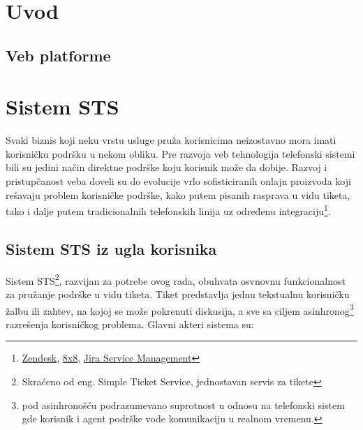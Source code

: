 \documentclass[12pt,oneside]{memoir}
\begin{document}
\frontmatter
\naslovna
\komisija
\apstrakt
\tableofcontents*

\mainmatter

\chapter{Uvod}
\section{Veb platforme}

\chapter{Sistem STS}
Svaki biznis koji neku vrstu usluge pruža korisnicima neizostavno mora imati korisničku podršku u nekom obliku. Pre razvoja veb tehnologija telefonski sistemi bili su jedini način direktne podrške koju korisnik može da dobije. Razvoj i pristupčanost veba doveli su do evolucije vrlo sofisticiranih onlajn proizvoda koji rešavaju problem korisničke podrške, kako putem pisanih rasprava u vidu tiketa, tako i dalje putem tradicionalnih telefonskih linija uz određenu integraciju\footnote{\href{http://zendesk.com}{Zendesk}, \href{https://www.8x8.com/}{8x8}, \href{https://www.atlassian.com/software/jira/service-management}{Jira Service Management}}.

\section{Sistem STS iz ugla korisnika}

Sistem STS\footnote{Skraćeno od eng. Simple Ticket Service, jednostavan servis za tikete}, razvijan za potrebe ovog rada, obuhvata osvnovnu funkcionalnost za pružanje podrške u vidu tiketa. Tiket predstavlja jednu tekstualnu korisničku žalbu ili zahtev, na kojoj se može pokrenuti diskusija, a sve sa ciljem asinhronog\footnote{pod asinhronošću podrazumevano suprotnost u odnosu na telefonski sistem gde korisnik i agent podrške vode komunikaciju u realnom vremenu.} razrešenja korisničkog problema. Glavni akteri sistema su:
\end{document}
